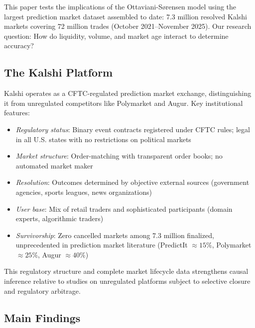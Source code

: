 \documentclass[a4paper,11pt]{article}
\theoremstyle{plain}
\theoremstyle{definition}
\begin{document}
This paper tests the implications of the Ottaviani-Sørensen model using the largest prediction market dataset assembled to date: 7.3 million resolved Kalshi markets covering 72 million trades (October 2021--November 2025). Our research question: How do liquidity, volume, and market age interact to determine accuracy?

\subsection{The Kalshi Platform}

Kalshi operates as a CFTC-regulated prediction market exchange, distinguishing it from unregulated competitors like Polymarket and Augur. Key institutional features:

\begin{itemize}
\item \textit{Regulatory status}: Binary event contracts registered under CFTC rules; legal in all U.S. states with no restrictions on political markets
\item \textit{Market structure}: Order-matching with transparent order books; no automated market maker
\item \textit{Resolution}: Outcomes determined by objective external sources (government agencies, sports leagues, news organizations)
\item \textit{User base}: Mix of retail traders and sophisticated participants (domain experts, algorithmic traders)
\item \textit{Survivorship}: Zero cancelled markets among 7.3 million finalized, unprecedented in prediction market literature (PredictIt $\approx 15\%$, Polymarket $\approx 25\%$, Augur $\approx 40\%$)
\end{itemize}

This regulatory structure and complete market lifecycle data strengthens causal inference relative to studies on unregulated platforms subject to selective closure and regulatory arbitrage.

\subsection{Main Findings}
\end{document}
